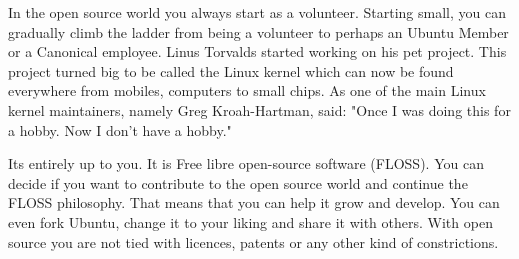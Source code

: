 \par \noindent In the open source world you always start as a volunteer. Starting small, you can gradually climb the ladder from being a volunteer to perhaps an Ubuntu Member or a Canonical employee. Linus Torvalds started working on his pet project. This project turned big to be called the Linux kernel which can now be found everywhere from mobiles, computers to small chips. As one of the main Linux kernel maintainers, namely Greg Kroah-Hartman, said: "Once I was doing this for a hobby. Now I don't have a hobby."  \\

\par \noindent Its entirely up to you. It is Free libre open-source software (FLOSS). You can decide if you want to contribute to the open source world and continue the FLOSS philosophy. That means that you can help it grow and develop. You can even fork Ubuntu, change it to your liking and share it with others. With open source you are not tied with licences, patents or any other kind of constrictions. 
